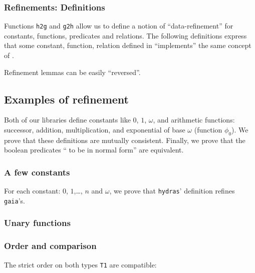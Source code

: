 



\subsubsection{Refinements: Definitions}


Functions \texttt{h2g} and \texttt{g2h} allow us to define
a notion of ``data-refinement''  for constants, functions, predicates and relations. The following definitions express that some
constant, function, relation defined in \HydrasLib ``implements'' the same concept of \gaia.









Refinement lemmas can be easily ``reversed''.


\subsection{Examples of refinement}
Both of our libraries define constants like $0$, $1$, $\omega$, and arithmetic functions: successor, addition, multiplication, and exponential of base $\omega$ (function $\phi_0$). We prove that these definitions are mutually consistent. Finally, we prove that the boolean predicates `` to be in normal form'' are equivalent.

\subsubsection{A few constants}
For each constant: $0$, $1$,\dots, $n$ and $\omega$, we prove
that \texttt{hydras}' definition refines \texttt{gaia}'s.


\subsubsection{Unary functions}


\subsubsection{Order and comparison}
\label{sect:lt-compat-gaia}
The  strict order on both types \texttt{T1} are
compatible:


